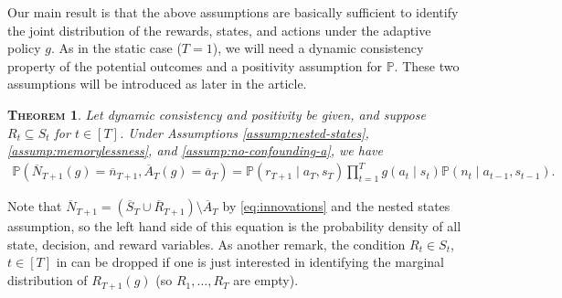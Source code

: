 \documentclass[12pt,a4paper]{article}
\newtheorem{theorem}{\normalfont\scshape Theorem}
\theoremstyle{definition}
\newcommand{\PP}[0]{\mathbb{P}}
\begin{document}
Our main result is that the above assumptions are basically sufficient
to identify the joint distribution of the rewards, states, and actions
under the adaptive policy $g$. As in the static case ($T = 1$), we
will need a dynamic consistency property of the potential outcomes and a
positivity assumption for $\PP$. These two assumptions will be
introduced as 
later in the article.
\begin{theorem}\label{thm:main_result}
    Let dynamic consistency and positivity be given, and suppose $R_t
    \subseteq S_t$ for $t \in [T]$. Under Assumptions \ref{assump:nested-states},
    \ref{assump:memorylessness}, and \ref{assump:no-confounding-a},
    we have%
    \begin{align*}
      \mathbb{P}(\overline{N}_{T+1}(g) =
      \overline{n}_{T+1}, \overline{A}_{T}(g) =
      \overline{a}_{T}) = \mathbb{P}(r_{T+1} \mid a_T, s_T)
      \prod_{t=1}^T g(a_{t} \mid s_{t}) \PP(n_{t} \mid a_{t-1},
      s_{t-1}).
    \end{align*}
\end{theorem}
Note that $\overline{N}_{T+1} = (\overline{S}_T \cup
\overline{R}_{T+1}) \setminus \overline{A}_T$ by \eqref{eq:innovations} and
the nested states assumption, so the left hand side of this equation
is the probability density of all state, decision, and reward
variables. As another remark, the condition $R_t \in S_t$, $t \in [T]$
in  can be dropped if one is just interested in
identifying the marginal distribution of $R_{T+1}(g)$ (so
$R_1,\dots,R_T$ are empty).
\end{document}
